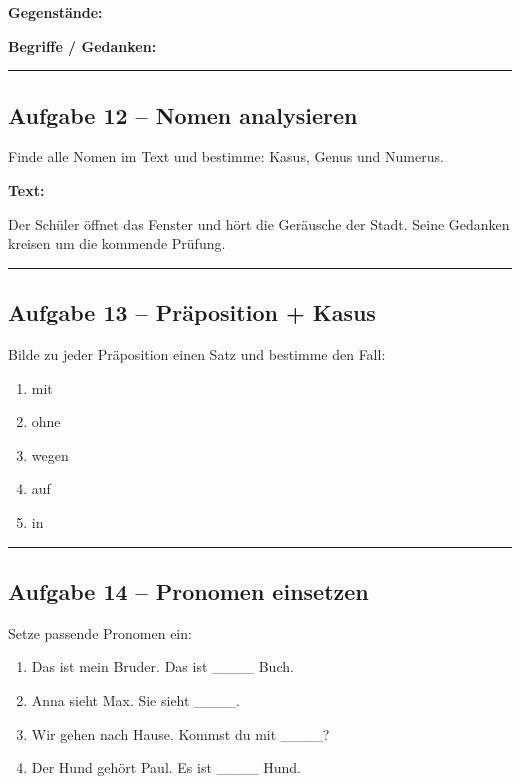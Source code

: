 \documentclass[a4paper,12pt]{article}
\newcommand{\linie}{\vspace{4pt}\hrule\vspace{10pt}}
\begin{document}
\textbf{Gegenstände:}

\vspace{10pt}

\textbf{Begriffe / Gedanken:}

\vspace{10pt}

\linie

\subsection*{Aufgabe 12 – Nomen analysieren}

Finde alle Nomen im Text und bestimme:
Kasus, Genus und Numerus.

\textbf{Text:}

Der Schüler öffnet das Fenster und hört die Geräusche der Stadt.  
Seine Gedanken kreisen um die kommende Prüfung.

\vspace{30pt}

\linie

\subsection*{Aufgabe 13 – Präposition + Kasus}

Bilde zu jeder Präposition einen Satz und bestimme den Fall:

\begin{enumerate}
\item mit  
\item ohne  
\item wegen  
\item auf  
\item in  
\end{enumerate}

\vspace{20pt}

\linie

\subsection*{Aufgabe 14 – Pronomen einsetzen}

Setze passende Pronomen ein:

\begin{enumerate}
\item Das ist mein Bruder. Das ist \_\_\_\_ Buch.  
\item Anna sieht Max. Sie sieht \_\_\_\_.  
\item Wir gehen nach Hause. Kommst du mit \_\_\_\_?  
\item Der Hund gehört Paul. Es ist \_\_\_\_ Hund.  
\end{enumerate}
\end{document}
